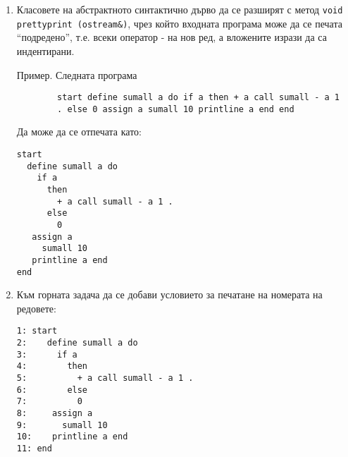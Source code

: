\documentclass[12pt,a4paper]{article}
\begin{document}
\begin{enumerate}
\begin{flushleft}
	\end{flushleft}

	\item Класовете на абстрактното синтактично дърво да се разширят с метод \texttt{void prettyprint (ostream\&)}, чрез който входната програма може да се печата ``подредено'', т.е. всеки оператор - на нов ред, а вложените изрази да са индентирани.

	Пример. Следната програма
	\begin{verbatim}
		start define sumall a do if a then + a call sumall - a 1 
		. else 0 assign a sumall 10 printline a end end
	\end{verbatim}

	Да може да се отпечата като:

	\begin{verbatim}
start
  define sumall a do 
    if a 
      then 
        + a call sumall - a 1 . 
      else 
        0 
   assign a 
     sumall 10 
   printline a end
end   
	\end{verbatim}

	\item Към горната задача да се добави условието за печатане на номерата на редовете:
	\begin{verbatim}
1: start
2:    define sumall a do 
3:      if a 
4:        then 
5:          + a call sumall - a 1 . 
6:        else 
7:          0 
8:     assign a 
9:       sumall 10 
10:    printline a end
11: end   

	\end{verbatim}


\end{enumerate}
\end{document}
